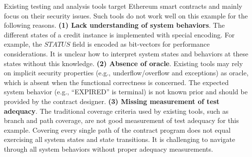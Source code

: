 
Existing testing and analysis tools target Ethereum smart contracts and mainly focus on their
security issues.
Such tools do not work well on this example for the following reasons.
\textbf{(1) Lack understanding of system behaviors}.
The different states of a credit instance is implemented with special encoding.
For example, the $\mathit{STATUS}$ field is encoded as bit-vectors for performance considerations.
It is unclear how to interpret system states and behaviors at these states without this knowledge.
\textbf{(2) Absence of oracle}.
Existing tools may rely on implicit security properties (e.g., underflow/overflow and exceptions)
as oracle, which is absent when the functional correctness is concerned.
The expected system behavior (e.g., ``EXPIRED'' is terminal) is not known prior and should be
provided by the contract designer.
\textbf{(3) Missing measurement of test adequacy}.
The traditional coverage criteria used by existing tools, such as branch and path coverage, are not
good measurement of test adequacy for this example.
Covering every single path of the contract program does not equal exercising all system states and
state transitions.
It is challenging to navigate through all system behaviors without proper adequacy measurements.


